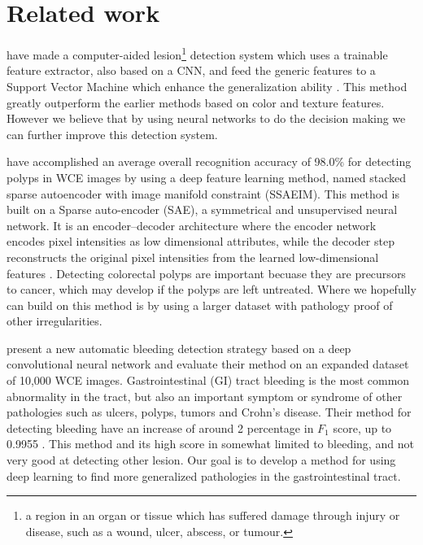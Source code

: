 \documentclass[english, a4paper]{article}
\begin{document}
\section{Related work} \label{related_work}
\citeauthor*{LesionDetection15} have made a computer-aided lesion\footnote{a region in an organ or tissue which has suffered damage through injury or disease, such as a wound, ulcer, abscess, or tumour.} detection system which uses a trainable feature extractor, also based on a CNN, and feed the generic features to a Support Vector Machine which enhance the generalization ability \cite{LesionDetection15}. This method greatly outperform the earlier methods based on color and texture features. However we believe that by using neural networks to do the decision making we can further improve this detection system. 

\medbreak 
\citeauthor*{DeepLearning17} have accomplished an average overall recognition accuracy of 98.0\% for detecting polyps in WCE images by using a deep feature learning method, named stacked sparse autoencoder with image manifold constraint (SSAEIM). This method is built on a Sparse auto-encoder (SAE), a symmetrical and unsupervised neural network. It is an encoder–decoder architecture where the encoder network encodes pixel intensities as low dimensional attributes, while the decoder step reconstructs the original pixel intensities from the learned low-dimensional features \cite{DeepLearning17}. Detecting colorectal polyps are important becuase they are precursors to cancer, which may develop if the polyps are left untreated. Where we hopefully can build on this method is by using a larger dataset with pathology proof of other irregularities.

\medbreak
\citeauthor*{DeepConvolutional16} present a new automatic bleeding detection strategy based on a deep convolutional neural network and evaluate their method on an expanded dataset of 10,000 WCE images. Gastrointestinal (GI) tract bleeding is the most common abnormality in the tract, but also an important symptom or syndrome of other pathologies such as ulcers, polyps, tumors and Crohn's disease. Their method for detecting bleeding have an increase of around 2 percentage in $F_1$ score, up to 0.9955 \cite{DeepConvolutional16}. This method and its high score in somewhat limited to bleeding, and not very good at detecting other lesion. 
Our goal is to develop a method for using deep learning to find more generalized pathologies in the gastrointestinal tract.
\end{document}
